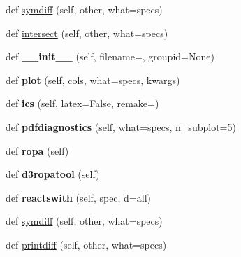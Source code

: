 \begin{DoxyCompactItemize}
def \mbox{\hyperlink{classexplore__dsmacc_1_1new_a9645f471aa02539559f99ecec3348b6f}{symdiff}} (self, other, what=\textquotesingle{}specs\textquotesingle{})
\item 
def \mbox{\hyperlink{classexplore__dsmacc_1_1new_acc9266b7b7ae7a41e337bd755288a60b}{intersect}} (self, other, what=\textquotesingle{}specs\textquotesingle{})
\item 
\mbox{\label{classexplore__dsmacc_1_1new_ac9a5be252fe5fa62492d22f6adccfc4a}} 
def {\bfseries \+\_\+\+\_\+init\+\_\+\+\_\+} (self, filename=\textquotesingle{}\textquotesingle{}, groupid=None)
\item 
\mbox{\label{classexplore__dsmacc_1_1new_a7efa1d2712e07026a2189a895c8489c9}} 
def {\bfseries plot} (self, cols, what=\textquotesingle{}specs\textquotesingle{}, kwargs)
\item 
\mbox{\label{classexplore__dsmacc_1_1new_a7415743a1f3ea1b8a10936b3b62dfdaf}} 
def {\bfseries ics} (self, latex=False, remake=\textquotesingle{}\textquotesingle{})
\item 
\mbox{\label{classexplore__dsmacc_1_1new_ae48303d87d4152d431dba936080030f7}} 
def {\bfseries pdfdiagnostics} (self, what=\textquotesingle{}specs\textquotesingle{}, n\+\_\+subplot=5)
\item 
\mbox{\label{classexplore__dsmacc_1_1new_aa50b9538f587f469ba1a265bf287929f}} 
def {\bfseries ropa} (self)
\item 
\mbox{\label{classexplore__dsmacc_1_1new_a9d3e99e661c4e1ab0e7ed61403678c91}} 
def {\bfseries d3ropatool} (self)
\item 
\mbox{\label{classexplore__dsmacc_1_1new_ae5c9611c4206460e36cd8a49340bc300}} 
def {\bfseries reactswith} (self, spec, d=\textquotesingle{}all\textquotesingle{})
\item 
def \mbox{\hyperlink{classexplore__dsmacc_1_1new_a9645f471aa02539559f99ecec3348b6f}{symdiff}} (self, other, what=\textquotesingle{}specs\textquotesingle{})
\item 
def \mbox{\hyperlink{classexplore__dsmacc_1_1new_a36b235122bd6e70ea453a0da1df3bc99}{printdiff}} (self, other, what=\textquotesingle{}specs\textquotesingle{})

\end{DoxyCompactItemize}
